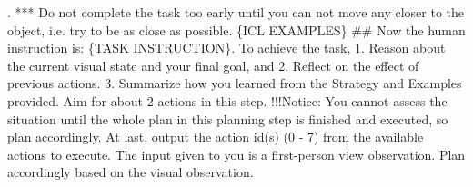\begin{tcolorbox}[colback=gray!5!white, colframe=gray!75!black, 
title=Prompt for EB-Navigation at step 0, boxrule=0.5mm, width=\textwidth, arc=3mm, auto outer arc=true]
. *** Do not complete the task too early until you can not move any closer to the object, i.e. try to be as close as possible.\newline
\newline
\{ICL EXAMPLES\}\newline
\newline
\#\# Now the human instruction is: \{TASK INSTRUCTION\}. To achieve the task, 1. Reason about the current visual state and your final goal, and 2. Reflect on the effect of previous actions. 3. Summarize how you learned from the Strategy and Examples provided. \newline 
Aim for about 2 actions in this step. !!!Notice: You cannot assess the situation until the whole plan in this planning step is finished and executed, so plan accordingly. \newline
At last, output the action id(s) (0 - 7) from the available actions to execute. \newline
\newline
The input given to you is a first-person view observation. Plan accordingly based on the visual observation.
\end{tcolorbox}

